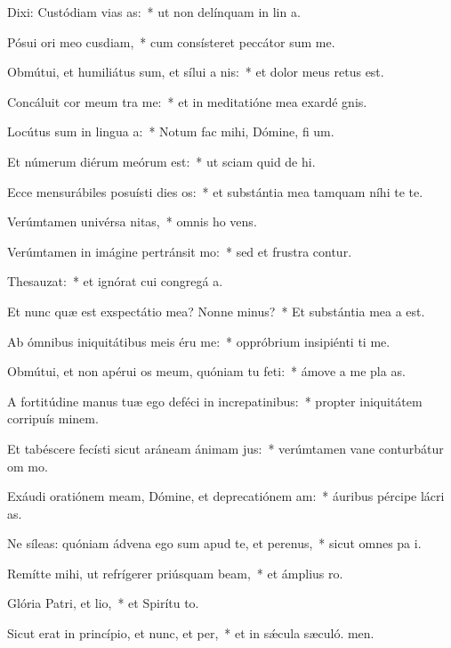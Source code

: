 \item Dixi: Custódiam vias as:~* ut non delínquam in lin a.
\item Pósui ori meo cusdiam,~* cum consísteret peccátor sum me.
\item Obmútui, et humiliátus sum, et sílui a nis:~* et dolor meus retus est.
\item Concáluit cor meum tra me:~* et in meditatióne mea exardé gnis.
\item Locútus sum in lingua a:~* Notum fac mihi, Dómine, fi um.
\item Et númerum diérum meórum  est:~* ut sciam quid de hi.
\item Ecce mensurábiles posuísti dies os:~* et substántia mea tamquam níhi te te.
\item Verúmtamen univérsa nitas,~* omnis ho vens.
\item Verúmtamen in imágine pertránsit mo:~* sed et frustra contur.
\item Thesauzat:~* et ignórat cui congregá a.
\item Et nunc quæ est exspectátio mea? Nonne minus?~* Et substántia mea a  est.
\item Ab ómnibus iniquitátibus meis éru me:~* oppróbrium insipiénti ti me.
\item Obmútui, et non apérui os meum, quóniam tu feti:~* ámove a me pla as.
\item A fortitúdine manus tuæ ego deféci in increpatinibus:~* propter iniquitátem corripuís minem.
\item Et tabéscere fecísti sicut aráneam ánimam jus:~* verúmtamen vane conturbátur om mo.
\item Exáudi oratiónem meam, Dómine, et deprecatiónem am:~* áuribus pércipe lácri as.
\item Ne síleas: quóniam ádvena ego sum apud te, et perenus,~* sicut omnes pa i.
\item Remítte mihi, ut refrígerer priúsquam beam,~* et ámplius  ro.
\item Glória Patri, et lio,~* et Spirítu to.
\item Sicut erat in princípio, et nunc, et per,~* et in sǽcula sæculó. men.
